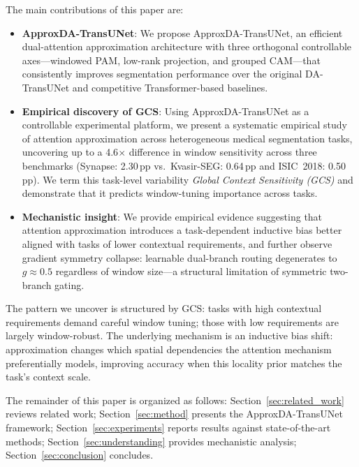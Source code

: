 The main contributions of this paper are:

\begin{itemize}

\item \textbf{ApproxDA-TransUNet}: We propose ApproxDA-TransUNet, an efficient dual-attention approximation architecture with three orthogonal controllable axes---windowed PAM, low-rank projection, and grouped CAM---that consistently improves segmentation performance over the original DA-TransUNet and competitive Transformer-based baselines.

\item \textbf{Empirical discovery of GCS}: Using ApproxDA-TransUNet as a controllable experimental platform, we present a systematic empirical study of attention approximation across heterogeneous medical segmentation tasks, uncovering up to a 4.6$\times$ difference in window sensitivity across three benchmarks (Synapse: 2.30\,pp vs.\ Kvasir-SEG: 0.64\,pp and ISIC~2018: 0.50\,pp). We term this task-level variability \emph{Global Context Sensitivity (GCS)} and demonstrate that it predicts window-tuning importance across tasks.

\item \textbf{Mechanistic insight}: We provide empirical evidence suggesting that attention approximation introduces a task-dependent inductive bias better aligned with tasks of lower contextual requirements, and further observe gradient symmetry collapse: learnable dual-branch routing degenerates to $g{\approx}0.5$ regardless of window size---a structural limitation of symmetric two-branch gating.

\end{itemize}

The pattern we uncover is structured by GCS: tasks with high contextual requirements demand careful window tuning; those with low requirements are largely window-robust. The underlying mechanism is an inductive bias shift: approximation changes which spatial dependencies the attention mechanism preferentially models, improving accuracy when this locality prior matches the task's context scale.

The remainder of this paper is organized as follows: Section~\ref{sec:related_work} reviews related work; Section~\ref{sec:method} presents the ApproxDA-TransUNet framework; Section~\ref{sec:experiments} reports results against state-of-the-art methods; Section~\ref{sec:understanding} provides mechanistic analysis; Section~\ref{sec:conclusion} concludes.
